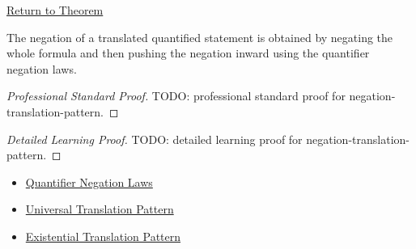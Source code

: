 \newpage
{}
\label{prf:negation-translation-pattern}

\begin{remark*}[Return]
\hyperref[prop:negation-translation-pattern]{Return to Theorem}
\end{remark*}

\begin{theorem*}
The negation of a translated quantified statement is obtained by negating the
whole formula and then pushing the negation inward using the quantifier
negation laws.
\end{theorem*}

\begin{proof}[Professional Standard Proof]
\LRAProofBodyStart
TODO: professional standard proof for negation-translation-pattern.
\end{proof}

\begin{proof}[Detailed Learning Proof]
\LRAProofBodyStart
TODO: detailed learning proof for negation-translation-pattern.
\end{proof}

\begin{remark*}
\end{remark*}

\begin{dependencies}
\begin{itemize}
  \item \hyperref[thm:qneg]{Quantifier Negation Laws}
  \item \hyperref[prop:universal-translation-pattern]{Universal Translation Pattern}
  \item \hyperref[prop:existential-translation-pattern]{Existential Translation Pattern}
\end{itemize}
\end{dependencies}

\clearpage
